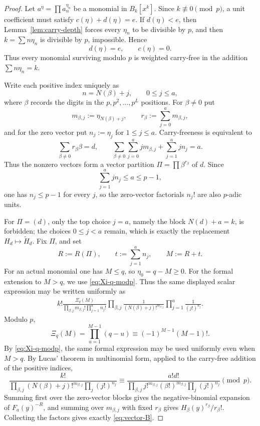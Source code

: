 \documentclass[11pt]{amsart}
\numberwithin{equation}{section}
\begin{document}
\begin{proof}
Let $a^\eta=\prod a_n^{\eta_n}$ be a monomial in $B_k[x^k]$.  Since $k\not\equiv0\pmod p$, a unit coefficient must satisfy $c(\eta)+d(\eta)=e$.  If $d(\eta)<e$, then Lemma~\ref{lem:carry-depth} forces every $\eta_n$ to be divisible by $p$, and then $k=\sum n\eta_n$ is divisible by $p$, impossible.  Hence
\[
        d(\eta)=e,
        \qquad
        c(\eta)=0.
\]
Thus every monomial surviving modulo $p$ is weighted carry-free in the addition $\sum n\eta_n=k$.

Write each positive index uniquely as
\[
        n=N(\beta)+j,
        \qquad
        0\le j\le a,
\]
where $\beta$ records the digits in the $p,p^2,\ldots,p^L$ positions.  For $\beta\ne0$ put
\[
        m_{\beta,j}:=\eta_{N(\beta)+j},
        \qquad
        r_\beta:=\sum_{j=0}^a m_{\beta,j},
\]
and for the zero vector put $n_j:=\eta_j$ for $1\le j\le a$.  Carry-freeness is equivalent to
\[
        \sum_{\beta\ne0}r_\beta\beta=d,
        \qquad
        \sum_{\beta\ne0}\sum_{j=0}^a jm_{\beta,j}+\sum_{j=1}^a jn_j=a.
\]
Thus the nonzero vectors form a vector partition $\Pi=\prod\beta^{r_\beta}$ of $d$.  Since
\[
        \sum_{j=1}^a jn_j\le a\le p-1,
\]
one has $n_j\le p-1$ for every $j$, so the zero-vector factorials $n_j!$ are also $p$-adic units.

For $\Pi=(d)$, only the top choice $j=a$, namely the block $N(d)+a=k$, is forbidden; the choices $0\le j<a$ remain, which is exactly the replacement $H_d\mapsto\widetilde H_d$.  Fix $\Pi$, and set
\[
        R:=R(\Pi),
        \qquad
        t:=\sum_{j=1}^a n_j,
        \qquad
        M:=R+t.
\]
For an actual monomial one has $M\le q$, so $\eta_0=q-M\ge0$.  For the formal extension to $M>q$, we use \eqref{eq:Xi-q-modp}.  Thus the same displayed scalar expression may be written uniformly as
\[
\begin{aligned}
        k!\frac{\Xi_q(M)}{\prod_{\beta,j}m_{\beta,j}!\prod_{j=1}^a n_j!}
        \prod_{\beta,j}\frac1{(N(\beta)+j)!^{m_{\beta,j}}}
        \prod_{j=1}^a\frac1{(j!)^{n_j}}.
\end{aligned}
\]
Modulo $p$,
\[
        \Xi_q(M)=\prod_{u=1}^{M-1}(q-u)\equiv(-1)^{M-1}(M-1)!.
\]
By \eqref{eq:Xi-q-modp}, the same formal expression may be used uniformly even when $M>q$.
By Lucas' theorem in multinomial form, applied to the carry-free addition of the positive indices,
\[
        \frac{k!}{\prod_{\beta,j}(N(\beta)+j)!^{m_{\beta,j}}\prod_j(j!)^{n_j}}
        \equiv
        \frac{a!d!}{\prod_{\beta,j}j!^{m_{\beta,j}}(\beta!)^{m_{\beta,j}}\prod_j(j!)^{n_j}}
        \pmod p.
\]
Summing first over the zero-vector blocks gives the negative-binomial expansion of $F_a(y)^{-R}$, and summing over $m_{\beta,j}$ with fixed $r_\beta$ gives $H_\beta(y)^{r_\beta}/r_\beta!$.  Collecting the factors gives exactly \eqref{eq:vector-B}.
\end{proof}
\end{document}
